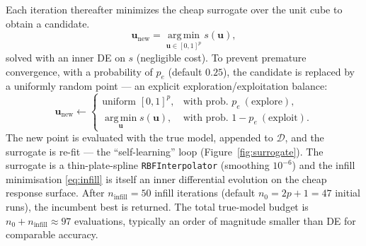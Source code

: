 \documentclass{article}
\begin{document}
Each iteration thereafter minimizes the cheap surrogate over
the unit cube to obtain a candidate.
\begin{equation}
  \bm{u}_{\mathrm{new}}=\operatorname*{arg\,min}_{\bm{u}\in[0,1]^p} s(\bm{u}),
  \label{eq:infill}
\end{equation}
solved with an inner DE on $s$ (negligible cost). To prevent premature
convergence, with a probability of $p_e$ (default $0.25$), the candidate is replaced by a
uniformly random point — an explicit exploration/exploitation balance:
\begin{equation}
  \bm{u}_{\mathrm{new}}\leftarrow
  \begin{cases}
    \text{uniform } [0,1]^p, & \text{with prob. } p_e \ (\text{explore}),\\[2pt]
    \operatorname*{arg\,min}_{\bm u} s(\bm u), & \text{with prob. } 1-p_e \ (\text{exploit}).
  \end{cases}
\end{equation}
The new point is evaluated with the true model, appended to $\mathcal{D}$, and the
surrogate is re-fit — the ``self-learning'' loop (Figure~\ref{fig:surrogate}).
The surrogate is a thin-plate-spline \texttt{RBFInterpolator} (smoothing
$10^{-6}$) and the infill minimisation \eqref{eq:infill} is itself an inner
differential evolution on the cheap response surface. After
$n_{\mathrm{infill}}=50$ infill iterations (default $n_0=2p+1=47$ initial runs),
the incumbent best is returned. The total true-model budget is
$n_0+n_{\mathrm{infill}}\approx 97$ evaluations, typically an order of magnitude
smaller than DE for comparable accuracy.
\end{document}
